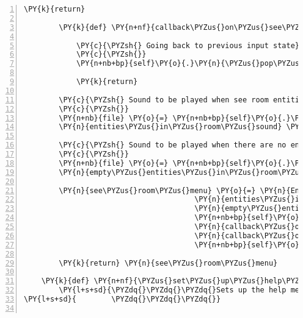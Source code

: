 \begin{Verbatim}[commandchars=\\\{\},numbers=left,firstnumber=1,stepnumber=1]
            \PY{k}{return}

        \PY{k}{def} \PY{n+nf}{callback\PYZus{}on\PYZus{}see\PYZus{}room\PYZus{}menu\PYZus{}exit}\PY{p}{(}\PY{n}{see\PYZus{}room\PYZus{}menu}\PY{p}{)}\PY{p}{:}

            \PY{c}{\PYZsh{} Going back to previous input state}
            \PY{c}{\PYZsh{}}
            \PY{n+nb+bp}{self}\PY{o}{.}\PY{n}{\PYZus{}pop\PYZus{}input\PYZus{}state\PYZus{}from\PYZus{}stack}\PY{p}{(}\PY{p}{)}

            \PY{k}{return}

        \PY{c}{\PYZsh{} Sound to be played when see room entities menu is opened}
        \PY{c}{\PYZsh{}}
        \PY{n+nb}{file} \PY{o}{=} \PY{n+nb+bp}{self}\PY{o}{.}\PY{n}{assets}\PY{o}{.}\PY{n}{fetch}\PY{p}{(}\PY{l+s}{\PYZsq{}}\PY{l+s}{entities\PYZus{}in\PYZus{}room.ogg}\PY{l+s}{\PYZsq{}}\PY{p}{)}
        \PY{n}{entities\PYZus{}in\PYZus{}room\PYZus{}sound} \PY{o}{=} \PY{n}{pygame}\PY{o}{.}\PY{n}{mixer}\PY{o}{.}\PY{n}{Sound}\PY{p}{(}\PY{n+nb}{file}\PY{p}{)}

        \PY{c}{\PYZsh{} Sound to be played when there are no entities in the room}
        \PY{c}{\PYZsh{}}
        \PY{n+nb}{file} \PY{o}{=} \PY{n+nb+bp}{self}\PY{o}{.}\PY{n}{assets}\PY{o}{.}\PY{n}{fetch}\PY{p}{(}\PY{l+s}{\PYZsq{}}\PY{l+s}{empty\PYZus{}entities\PYZus{}in\PYZus{}room.ogg}\PY{l+s}{\PYZsq{}}\PY{p}{)}
        \PY{n}{empty\PYZus{}entities\PYZus{}in\PYZus{}room\PYZus{}sound} \PY{o}{=} \PY{n}{pygame}\PY{o}{.}\PY{n}{mixer}\PY{o}{.}\PY{n}{Sound}\PY{p}{(}\PY{n+nb}{file}\PY{p}{)}

        \PY{n}{see\PYZus{}room\PYZus{}menu} \PY{o}{=} \PY{n}{EntityMenuList}\PY{p}{(}\PY{p}{[}\PY{p}{]}\PY{p}{,}
                                       \PY{n}{entities\PYZus{}in\PYZus{}room\PYZus{}sound}\PY{p}{,}
                                       \PY{n}{empty\PYZus{}entities\PYZus{}in\PYZus{}room\PYZus{}sound}\PY{p}{,}
                                       \PY{n+nb+bp}{self}\PY{o}{.}\PY{n}{channel\PYZus{}system}\PY{p}{,}
                                       \PY{n}{callback\PYZus{}on\PYZus{}item\PYZus{}in\PYZus{}room\PYZus{}selected}\PY{p}{,}
                                       \PY{n}{callback\PYZus{}on\PYZus{}see\PYZus{}room\PYZus{}menu\PYZus{}exit}\PY{p}{,}
                                       \PY{n+nb+bp}{self}\PY{o}{.}\PY{n}{tts\PYZus{}engine}\PY{p}{)}

        \PY{k}{return} \PY{n}{see\PYZus{}room\PYZus{}menu}

    \PY{k}{def} \PY{n+nf}{\PYZus{}set\PYZus{}up\PYZus{}help\PYZus{}menu}\PY{p}{(}\PY{n+nb+bp}{self}\PY{p}{)}\PY{p}{:}
        \PY{l+s+sd}{\PYZdq{}\PYZdq{}\PYZdq{}Sets up the help menu list.}
\PY{l+s+sd}{        \PYZdq{}\PYZdq{}\PYZdq{}}


\end{Verbatim}

